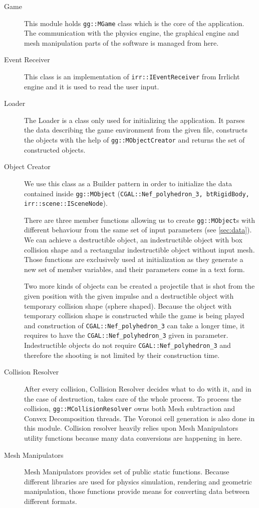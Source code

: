 \begin{description}
\item[Game]
This module holds {\tt gg::MGame} class which is the core of the application. The communication with the physics engine,  the graphical engine and mesh manipulation parts of the software is managed from here.

\item[Event Receiver]
This class is an implementation of {\tt irr::IEventReceiver} from Irrlicht engine and it is used to read the user input.

\item[Loader]
The Loader is a class only used for initializing the application. It parses the data describing the game environment from the given file, constructs the objects with the help of {\tt gg::MObjectCreator} and returns the set of constructed objects.

\item[Object Creator]
We use this class as a Builder pattern in order to initialize the data contained inside {\tt gg::MObject} ({\tt CGAL::Nef\_polyhedron\_3, btRigidBody, irr::scene::ISceneNode}).

There are three member functions allowing us to create {\tt gg::MObject}s  with different behaviour from the same set of input parameters (see \cref{sec:data}). We can achieve a destructible object, an indestructible object with box collision shape and a rectangular indestructible object without input mesh. Those functions are exclusively used at initialization as they generate a new set of member variables, and their parameters come in a text form.

Two more kinds of objects can be created a projectile that is shot from the given position with the given impulse and a destructible object with temporary collision shape (sphere shaped). Because the object with temporary collision shape is constructed while the game is being played and construction of {\tt CGAL::Nef\_polyhedron\_3} can take a longer time, it requires to have the {\tt CGAL::Nef\_polyhedron\_3} given in parameter. Indestructible objects do not require {\tt CGAL::Nef\_polyhedron\_3}  and therefore the shooting is not limited by their construction time.

\item[Collision Resolver]
After every collision, Collision Resolver decides what to do with it, and in the case of destruction, takes care of the whole process. To process the collision, {\tt gg::MCollisionResolver} owns both Mesh subtraction and Convex Decomposition threads. The Voronoi cell generation is also done in this module. Collision resolver heavily relies upon Mesh Manipulators utility functions because many data conversions are happening in here.

\item[Mesh Manipulators]
Mesh Manipulators provides set of public static functions. Because different libraries are used for physics simulation, rendering and geometric manipulation, those functions provide means for converting data between different formats.
\end{description}